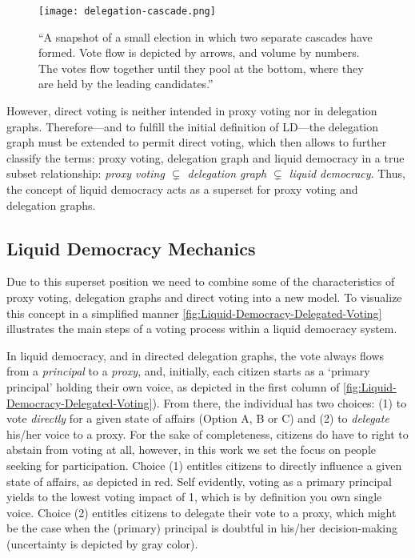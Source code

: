\begin{figure}[H]
\centering
\texttt{[image: delegation-cascade.png]}
	\caption[Delegate cascade voting]{“A snapshot of a small election in which two separate cascades have formed. Vote flow is depicted by arrows, and volume by numbers. The votes flow together until they pool at the bottom, where they are held by the leading candidates.” \parencite{Allen2008}}
	\label{fig:Delegation-Cascade}
\end{figure}
However, direct voting is neither intended in proxy voting nor in delegation graphs. Therefore---and to fulfill the initial definition of \acrshort{LD}---the delegation graph must be extended to permit direct voting, which then allows to further classify the terms: proxy voting, delegation graph and liquid democracy in a true subset relationship: \textit{proxy voting \(\subsetneq\) delegation graph \(\subsetneq\) liquid democracy}. Thus, the concept of liquid democracy acts as a superset for proxy voting and delegation graphs. 

\subsection{Liquid Democracy Mechanics}
\label{ssec:Liquid_Democracy_Mechanics}

Due to this superset position we need to combine some of the characteristics of proxy voting, delegation graphs and direct voting into a new model. To visualize this concept in a simplified manner \autoref{fig:Liquid-Democracy-Delegated-Voting} illustrates the main steps of a voting process within a liquid democracy system.

In liquid democracy, and in directed delegation graphs, the vote always flows from a \textit{principal} to a \textit{proxy}, and, initially, each citizen starts as a `primary principal' holding their own voice, as depicted in the first column of \autoref{fig:Liquid-Democracy-Delegated-Voting}). From there, the individual has two choices: (1) to vote \textit{directly} for a given state of affairs (Option A, B or C) and (2) to \textit{delegate} his/her voice to a proxy. For the sake of completeness, citizens do have to right to abstain from voting at all, however, in this work we set the focus on people seeking for participation. Choice (1) entitles citizens to directly influence a given state of affairs, as depicted in red. Self evidently, voting as a primary principal yields to the lowest voting impact of 1, which is by definition you own single voice. Choice (2) entitles citizens to delegate their vote to a proxy, which might be the case when the (primary) principal is doubtful in his/her decision-making (uncertainty is depicted by gray color).

